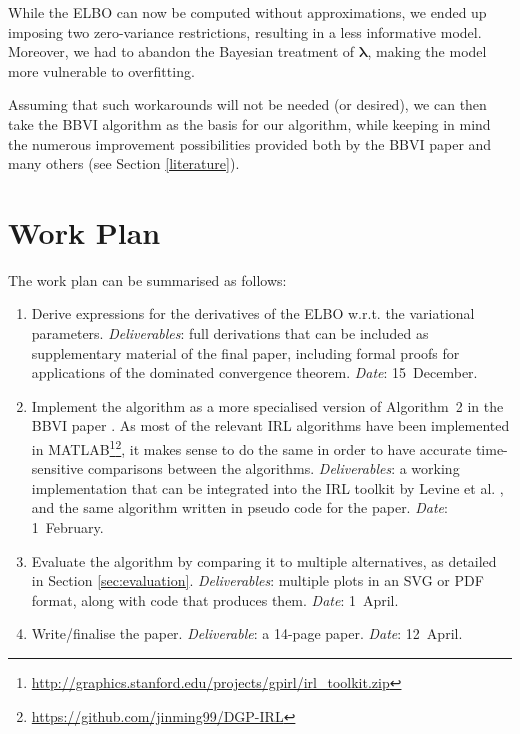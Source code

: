 \documentclass{mprop}
\theoremstyle{definition}
\begin{document}
While the ELBO can now be computed without approximations, we ended up imposing
two zero-variance restrictions, resulting in a less informative model. Moreover,
we had to abandon the Bayesian treatment of $\bm\lambda$, making the model more
vulnerable to overfitting.

Assuming that such workarounds will not be needed (or desired), we can then take
the BBVI algorithm as the basis for our algorithm, while keeping in mind the
numerous improvement possibilities provided both by the BBVI paper
\cite{DBLP:conf/aistats/RanganathGB14} and many others (see Section
\ref{literature}).

\section{Work Plan}

The work plan can be summarised as follows:
\begin{enumerate}
\item Derive expressions for the derivatives of the ELBO w.r.t. the variational
  parameters. \emph{Deliverables}: full derivations that can be included as
  supplementary material of the final paper, including formal proofs for
  applications of the dominated convergence theorem. \emph{Date}: 15~December.
\item Implement the algorithm as a more specialised version of Algorithm~2 in
  the BBVI paper \cite{DBLP:conf/aistats/RanganathGB14}. As most of the relevant
  IRL algorithms have been implemented in
  MATLAB\footnote{\url{http://graphics.stanford.edu/projects/gpirl/irl_toolkit.zip}}\footnote{\url{https://github.com/jinming99/DGP-IRL}},
  it makes sense to do the same in order to have accurate time-sensitive
  comparisons between the algorithms. \emph{Deliverables}: a working
  implementation that can be integrated into the IRL toolkit by Levine et al.
  \cite{DBLP:conf/nips/LevinePK11}, and the same algorithm written in pseudo
  code for the paper. \emph{Date}: 1~February.
\item Evaluate the algorithm by comparing it to multiple alternatives, as
  detailed in Section \ref{sec:evaluation}. \emph{Deliverables}: multiple plots
  in an SVG or PDF format, along with code that produces them. \emph{Date}:
  1~April.
\item Write/finalise the paper. \emph{Deliverable}: a 14-page paper.
  \emph{Date}: 12~April.
\end{enumerate}
\end{document}
